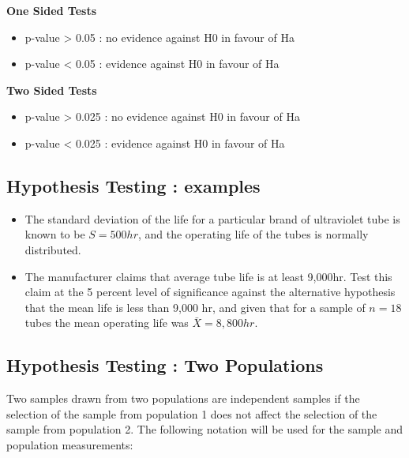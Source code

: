 \begin{framed}	
	\textbf{One Sided Tests}
	\begin{itemize}
		\item 		p-value  >  0.05   :   no evidence against H0 in favour of Ha
		
		\item 	p-value    <  0.05   :   evidence against H0 in favour of Ha
	\end{itemize}	
	\textbf{Two Sided Tests}
	\begin{itemize}
		\item 	p-value    >  0.025   :   no evidence against H0 in favour of Ha
		
		\item 	p-value    <  0.025   :   evidence against H0 in favour of Ha
	\end{itemize}		
\end{framed}





\subsection{Hypothesis Testing : examples}

\begin{itemize}
	\item The standard deviation of the life for a particular brand of
	ultraviolet tube is known to be $S = 500 hr$, and the operating
	life of the tubes is normally distributed. 
	\item The manufacturer claims
	that average tube life is at least 9,000hr. Test this claim at the
	5 percent level of significance against the alternative hypothesis
	that the mean life is less than 9,000 hr, and given that for a
	sample of $n = 18$ tubes the mean operating life was $\bar{X}=
	8,800 hr.$
	
\end{itemize}

\subsection{Hypothesis Testing : Two Populations}

Two samples drawn from two populations are independent samples if
the selection of the sample from population 1 does not affect the
selection of the sample from population 2. The following notation
will be used for the sample and population measurements:

